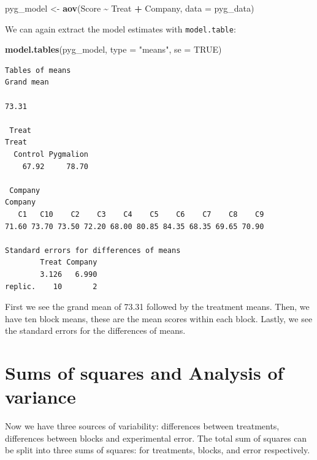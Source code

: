 \documentclass[
  letterpaper,
]{book}
\newenvironment{Shaded}{\begin{snugshade}}{\end{snugshade}}
\newcommand{\AttributeTok}[1]{\textcolor[rgb]{0.13,0.29,0.53}{#1}}
\newcommand{\ConstantTok}[1]{\textcolor[rgb]{0.56,0.35,0.01}{#1}}
\newcommand{\FunctionTok}[1]{\textcolor[rgb]{0.13,0.29,0.53}{\textbf{#1}}}
\newcommand{\NormalTok}[1]{#1}
\newcommand{\OtherTok}[1]{\textcolor[rgb]{0.56,0.35,0.01}{#1}}
\newcommand{\SpecialCharTok}[1]{\textcolor[rgb]{0.81,0.36,0.00}{\textbf{#1}}}
\newcommand{\StringTok}[1]{\textcolor[rgb]{0.31,0.60,0.02}{#1}}
\begin{document}
\begin{Shaded}
\begin{Highlighting}[]
\NormalTok{pyg\_model }\OtherTok{\textless{}{-}} \FunctionTok{aov}\NormalTok{(Score }\SpecialCharTok{\textasciitilde{}}\NormalTok{ Treat }\SpecialCharTok{+}\NormalTok{ Company, }\AttributeTok{data =}\NormalTok{ pyg\_data)}
\end{Highlighting}
\end{Shaded}

We can again extract the model estimates with \texttt{model.table}:

\begin{Shaded}
\begin{Highlighting}[]
\FunctionTok{model.tables}\NormalTok{(pyg\_model, }\AttributeTok{type =} \StringTok{"means"}\NormalTok{, }\AttributeTok{se =} \ConstantTok{TRUE}\NormalTok{)}
\end{Highlighting}
\end{Shaded}

\begin{verbatim}
Tables of means
Grand mean
      
73.31 

 Treat 
Treat
  Control Pygmalion 
    67.92     78.70 

 Company 
Company
   C1   C10    C2    C3    C4    C5    C6    C7    C8    C9 
71.60 73.70 73.50 72.20 68.00 80.85 84.35 68.35 69.65 70.90 

Standard errors for differences of means
        Treat Company
        3.126   6.990
replic.    10       2
\end{verbatim}

First we see the grand mean of 73.31 followed by the treatment means.
Then, we have ten block means, these are the mean scores within each
block. Lastly, we see the standard errors for the differences of means.

\section*{Sums of squares and Analysis of
variance}\label{sums-of-squares-and-analysis-of-variance}


Now we have three sources of variability: differences between
treatments, differences between blocks and experimental error. The total
sum of squares can be split into three sums of squares: for treatments,
blocks, and error respectively.
\end{document}
